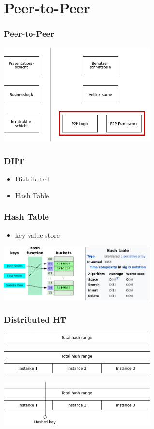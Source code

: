 \documentclass{beamer}
\begin{document}
\section{Peer-to-Peer}
\begin{frame}
  \frametitle{Peer-to-Peer}
  \includegraphics[width=8cm]{Schichten-p2p}
\end{frame}

\begin{frame}
  \frametitle{DHT}

  \begin{itemize}
    \item Distributed
    \item Hash Table
  \end{itemize}
\end{frame}

\begin{frame}
  \frametitle{Hash Table}

  \begin{itemize}
    \item key-value store
  \end{itemize}

  \medskip
  \includegraphics[width=8cm]{ht}
\end{frame}

\begin{frame}[allowframebreaks]
  \frametitle{Distributed HT}

  \includegraphics[width=8cm]{dht1}

  \break

  \includegraphics[width=8cm]{dht2}

  \break

  \includegraphics[width=8cm]{dht3}
\end{frame}
\end{document}
